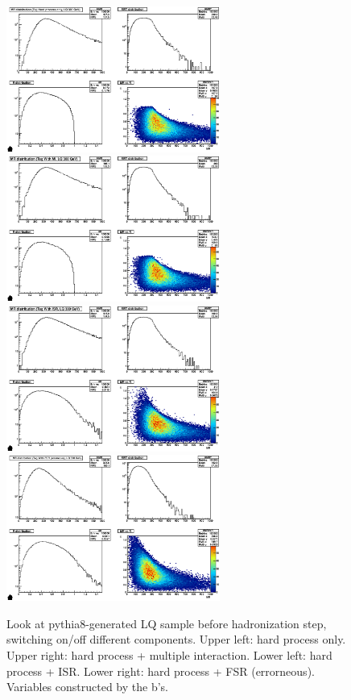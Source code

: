\documentclass{fheadnote}
\begin{document}
\begin{figure}[htbp]
   \centering
   \includegraphics[width=7cm]{Figures/MRToy11_Nothing}
   \includegraphics[width=7cm]{Figures/MRToy11_MI}\\
   \includegraphics[width=7cm]{Figures/MRToy11_ISR}
   \includegraphics[width=7cm]{Figures/MRToy11_FSR}
   \caption{Look at pythia8-generated LQ sample before hadronization step, switching on/off different components.  Upper left: hard process only.  Upper right: hard process + multiple interaction.
   Lower left: hard process + ISR.  Lower right: hard process + FSR (errorneous).  Variables constructed by the b's.}
   \label{Figure_MRToy11}
\end{figure}
\end{document}
